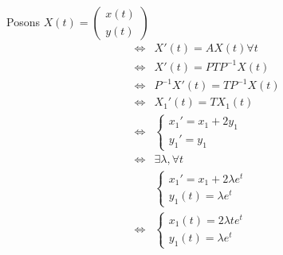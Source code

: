 \documentclass{article}
\begin{document}
Posons \(X(t) = \begin{pmatrix}
    x(t)\\y(t)
\end{pmatrix}
\)\\
\begin{align*}
  \Leftrightarrow &X'(t) = AX(t) \forall t \\
  \Leftrightarrow &X'(t) = PTP^{-1}X(t) \\
  \Leftrightarrow &P^{-1}X'(t) = TP^{-1}X(t) \\
  \Leftrightarrow &X_1'(t) = TX_1(t)\\
  \Leftrightarrow &\begin{cases}
    x_1' = x_1 + 2y_1 \\ 
    y_1' = y_1
  \end{cases}\\
  \Leftrightarrow &\exists \lambda, \forall t\\
                  &\begin{cases}
    x_1' = x_1 + 2 \lambda e^t\\
    y_1(t) = \lambda e^t
  \end{cases}\\
  \Leftrightarrow &\begin{cases}
    x_1(t) = 2 \lambda t e^t \\
    y_1(t) = \lambda e^t
  \end{cases}
\end{align*}
\end{document}
